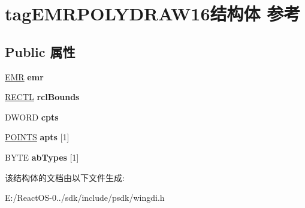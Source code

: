 \hypertarget{structtag_e_m_r_p_o_l_y_d_r_a_w16}{}\section{tag\+E\+M\+R\+P\+O\+L\+Y\+D\+R\+A\+W16结构体 参考}
\label{structtag_e_m_r_p_o_l_y_d_r_a_w16}
\subsection*{Public 属性}
\begin{DoxyCompactItemize}
\item 
\mbox{\label{structtag_e_m_r_p_o_l_y_d_r_a_w16_a6058fa9bec7ed5cfba70f49c0422f9e1}} 
\hyperlink{structtag_e_m_r}{E\+MR} {\bfseries emr}
\item 
\mbox{\label{structtag_e_m_r_p_o_l_y_d_r_a_w16_a7c55f9df870ce84005bd954c6899a5fb}} 
\hyperlink{struct___r_e_c_t_l}{R\+E\+C\+TL} {\bfseries rcl\+Bounds}
\item 
\mbox{\label{structtag_e_m_r_p_o_l_y_d_r_a_w16_ac4ee25e6b094ba41317fdb80a106d80a}} 
D\+W\+O\+RD {\bfseries cpts}
\item 
\mbox{\label{structtag_e_m_r_p_o_l_y_d_r_a_w16_a98d9bed02a76b456edf88d01a2965392}} 
\hyperlink{structtag_p_o_i_n_t_s}{P\+O\+I\+N\+TS} {\bfseries apts} \mbox{[}1\mbox{]}
\item 
\mbox{\label{structtag_e_m_r_p_o_l_y_d_r_a_w16_a12f7e09f43d3a72e5c147427f004e737}} 
B\+Y\+TE {\bfseries ab\+Types} \mbox{[}1\mbox{]}
\end{DoxyCompactItemize}


该结构体的文档由以下文件生成\+:\begin{DoxyCompactItemize}
\item 
E\+:/\+React\+O\+S-\/0../sdk/include/psdk/wingdi.\+h\end{DoxyCompactItemize}
